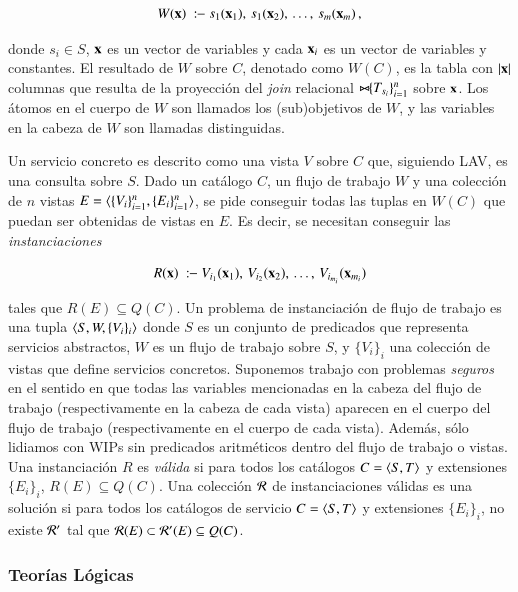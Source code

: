 \[ W(\vvec{x})\ \qrule\ s_1(\vvec{x}_1),\,s_1(\vvec{x}_2),\,\ldots,\,s_m(\vvec{x}_m)\,, \]

donde $s_i\in S$, $\mathbf{x}$ es un vector de variables y cada $\mathbf{x}_i$ es un vector de variables y
constantes. El resultado de $W$ sobre $C$, denotado como $W(C)$, es la tabla con
 $|\mathbf{x}|$ columnas que resulta de la proyección del \emph{join} relacional
$\bowtie\!\!\{T_{s_i}\}_{i=1}^n$ sobre $\mathbf{x}$. Los átomos en el cuerpo de $W$ son llamados los
(sub)objetivos de $W$, y las variables en la cabeza de $W$ son llamadas
distinguidas.

Un servicio concreto es descrito como una vista $V$ sobre $C$ que, siguiendo
LAV, es una consulta sobre $S$. Dado un catálogo $C$, un flujo de trabajo $W$ y
una colección de $n$ vistas $E=\langle \{V_i\}_{i=1}^n,\{E_i\}_{i=1}^n \rangle$, se pide
conseguir todas las tuplas en
$W(C)$ que puedan ser obtenidas de vistas en $E$. Es decir, se necesitan
conseguir las \emph{instanciaciones}

\[ R(\vvec{x})\ \qrule\ V_{i_1}(\vvec{x}_1),\,V_{i_2}(\vvec{x}_2),\,\ldots,\,V_{i_{m_i}}(\vvec{x}_{m_i}) \]

tales que $R(E) \subseteq Q(C)$.
Un problema de instanciación de flujo de trabajo es una
tupla $\langle S,W,\{V_i\}_i \rangle$ donde $S$ es un conjunto de predicados
que representa servicios
abstractos, $W$ es un flujo de trabajo sobre $S$, y $\{V_i\}_i$ una colección de vistas
que define servicios concretos. Suponemos trabajo con problemas \emph{seguros}
en el sentido en que todas las variables mencionadas en la cabeza del flujo de
trabajo (respectivamente en la cabeza de cada vista) aparecen en el cuerpo del
flujo de trabajo (respectivamente en el cuerpo de cada vista). Además, sólo
lidiamos con WIPs sin predicados aritméticos dentro del flujo de trabajo o
vistas. Una instanciación $R$ es \emph{válida} si para todos los catálogos $C=\langle S,T \rangle$ y
extensiones $\{E_i\}_i$, $R(E)\subseteq Q(C)$. Una colección $\mathcal{R}$ de instanciaciones válidas es una
solución si para todos los catálogos de servicio $C=\langle S,T \rangle$ y extensiones $\{E_i\}_i$, no
existe $\mathcal{R}'$ tal que $\mathcal{R}(E)\subset\mathcal{R}'(E)\subseteq Q(C)$.

\subsubsection{Teorías Lógicas}

